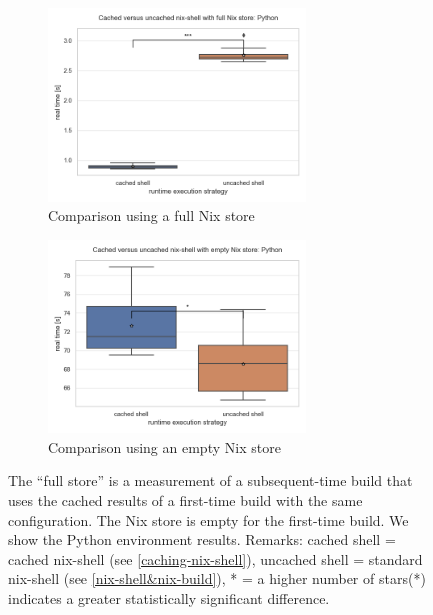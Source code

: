 \begin{figure}[h!]
    \centering
    \begin{subfigure}{\textwidth}
        \centering
      \includegraphics[width=0.75\textwidth]{thesis/graphics/nsar-plots/cached_versus_uncached_nix-shell_with_full_nix_store:_python.png}
      \caption{Comparison using a full Nix store}
      \label{fig:nsar-cached-vs-uncached-full-store-python}
    \end{subfigure}
    \begin{subfigure}{\textwidth}
      \centering
      \includegraphics[width=0.75\textwidth]{thesis/graphics/nsar-plots/cached_versus_uncached_nix-shell_with_empty_nix_store:_python.png}
      \caption{Comparison using an empty Nix store}
      \label{fig:nsar-cached-vs-uncached-empty-store-python}
    \end{subfigure} 
    \caption{The ``full store'' is a measurement of a subsequent-time build that uses the cached results of a first-time build with the same configuration. The Nix store is empty for the first-time build. We show the Python environment results. Remarks: cached shell = cached nix-shell (see \ref{caching-nix-shell}), uncached shell = standard nix-shell (see \ref{nix-shell&nix-build}), * = a higher number of stars(*) indicates a greater statistically significant difference.}
    \label{fig:nsar-cached-vs-uncached}
\end{figure}

